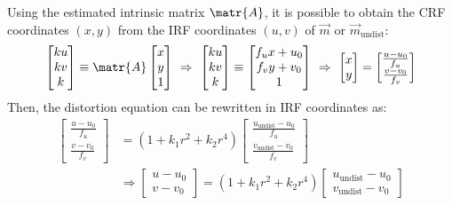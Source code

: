 \begin{description}
        Using the estimated intrinsic matrix $\matr{A}$, it is possible to obtain the CRF coordinates $(x, y)$ from the IRF coordinates $(u, v)$ 
        of $\vec{m}$ or $\vec{m}_\text{undist}$:
        \[
            \begin{bmatrix} ku \\ kv \\ k \end{bmatrix} \equiv \matr{A} \begin{bmatrix} x \\ y \\ 1 \end{bmatrix} \,\,\Rightarrow\,\,
            \begin{bmatrix} ku \\ kv \\ k \end{bmatrix} \equiv \begin{bmatrix} f_u x + u_0 \\ f_v y + v_0 \\ 1 \end{bmatrix} \,\,\Rightarrow\,\,
            \begin{bmatrix} x \\ y \end{bmatrix} = \begin{bmatrix} \frac{u-u_0}{f_u} \\ \frac{v-v_0}{f_v} \end{bmatrix}
        \]
        Then, the distortion equation can be rewritten in IRF coordinates as:
        \[
            \begin{split}
                \begin{bmatrix} \frac{u-u_0}{f_u} \\ \frac{v-v_0}{f_v} \end{bmatrix} &=
                    (1 + k_1r^2 + k_2r^4) \begin{bmatrix} \frac{u_\text{undist}-u_0}{f_u} \\ \frac{v_\text{undist}-v_0}{f_v} \end{bmatrix} \\
                &\Rightarrow \begin{bmatrix} u-u_0 \\ v-v_0 \end{bmatrix} = (1 + k_1r^2 + k_2r^4) \begin{bmatrix} u_\text{undist}-u_0 \\ v_\text{undist}-v_0 \end{bmatrix} \\

\end{split}\]
\end{description}
